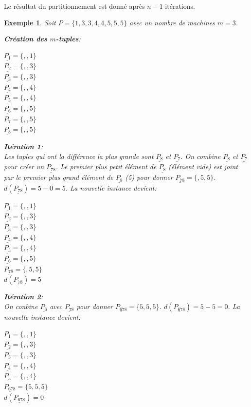 \documentclass[a4paper,12pt]{report}
\theoremstyle{plain}				%
\newtheorem{example}{Exemple}
\theoremstyle{definition}				%
\begin{document}
\begin{itemize}
Le résultat du partitionnement est donné après $n-1$ itérations.

\begin{example}

Soit $P=\{1,3,3,4,4,5,5,5\}$ avec un nombre de machines $m=3$.

\textbf{Création des $m$-tuples}:
\begin{multicols}{3}
$\underline{P_{1}} = \{,,1\}$\\
$\underline{P_{2}} = \{,,3\}$\\
$\underline{P_{3}} = \{,,3\}$\\
$\underline{P_{4}} = \{,,4\}$\\
$\underline{P_{5}} = \{,,4\}$\\
$\underline{P_{6}} = \{,,5\}$\\
$\underline{P_{7}} = \{,,5\}$\\
$\underline{P_{8}} = \{,,5\}$
\end{multicols}

\textbf{Itération 1}:\\
Les tuples qui ont la différence la plus grande sont
$\underline{P_{8}}$  et $\underline{P_{7}}$.
On combine $\underline{P_{8}}$ et $\underline{P_{7}}$ pour créer un
$\underline{P_{78}}$. Le premier plus petit élément de
$\underline{P_{8}}$ (élément vide) est joint par le premier plus grand
élément de $\underline{P_{8}}$ (5) pour donner $\underline{P_{78}} =
\{,5,5\}$. $d(\underline{P_{78}}) = 5-0 = 5$.
La nouvelle instance devient:
\begin{multicols}{3}
$\underline{P_{1}} = \{,,1\}$\\
$\underline{P_{2}} = \{,,3\}$\\
$\underline{P_{3}} = \{,,3\}$\\
$\underline{P_{4}} = \{,,4\}$\\
$\underline{P_{5}} = \{,,4\}$\\
$\underline{P_{6}} = \{,,5\}$\\
$\underline{P_{78}} = \{,5,5\}$\\
$d(\underline{P_{78}})=5$
\end{multicols}

\textbf{Itération 2}:\\
On conbine $\underline{P_{6}}$ avec $\underline{P_{78}}$ pour donner
$\underline{P_{678}} = \{5,5,5\}$. $d(\underline{P_{678}}) = 5-5 =
0$.
La nouvelle instance devient:
\begin{multicols}{3}
$\underline{P_{1}} = \{,,1\}$\\
$\underline{P_{2}} = \{,,3\}$\\
$\underline{P_{3}} = \{,,3\}$\\
$\underline{P_{4}} = \{,,4\}$\\
$\underline{P_{5}} = \{,,4\}$\\
$\underline{P_{678}} = \{5,5,5\}$\\
$d(\underline{P_{678}}) = 0$
\end{multicols}


\end{example}
\end{itemize}
\end{document}
